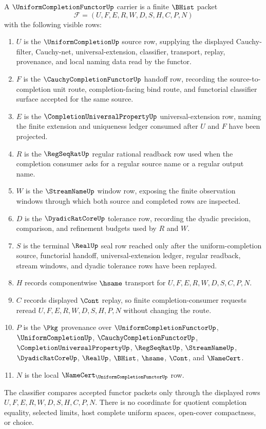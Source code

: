 \begin{definition}
\label{def:uniform-completion-functor-carrier}
A $\UniformCompletionFunctorUp$ carrier is a finite $\BHist$ packet
$$
\mathcal{F}=(U,F,E,R,W,D,S,H,C,P,N)
$$
with the following visible rows:
\begin{enumerate}
\item $U$ is the $\UniformCompletionUp$ source row, supplying the displayed Cauchy-filter, Cauchy-net, universal-extension, classifier, transport, replay, provenance, and local naming data read by the functor.
\item $F$ is the $\CauchyCompletionFunctorUp$ handoff row, recording the source-to-completion unit route, completion-facing bind route, and functorial classifier surface accepted for the same source.
\item $E$ is the $\CompletionUniversalPropertyUp$ universal-extension row, naming the finite extension and uniqueness ledger consumed after $U$ and $F$ have been projected.
\item $R$ is the $\RegSeqRatUp$ regular rational readback row used when the completion consumer asks for a regular source name or a regular output name.
\item $W$ is the $\StreamNameUp$ window row, exposing the finite observation windows through which both source and completed rows are inspected.
\item $D$ is the $\DyadicRatCoreUp$ tolerance row, recording the dyadic precision, comparison, and refinement budgets used by $R$ and $W$.
\item $S$ is the terminal $\RealUp$ seal row reached only after the uniform-completion source, functorial handoff, universal-extension ledger, regular readback, stream windows, and dyadic tolerance rows have been replayed.
\item $H$ records componentwise $\hsame$ transport for $U,F,E,R,W,D,S,C,P,N$.
\item $C$ records displayed $\Cont$ replay, so finite completion-consumer requests reread $U,F,E,R,W,D,S,H,P,N$ without changing the route.
\item $P$ is the $\Pkg$ provenance over $\UniformCompletionFunctorUp$, $\UniformCompletionUp$, $\CauchyCompletionFunctorUp$, $\CompletionUniversalPropertyUp$, $\RegSeqRatUp$, $\StreamNameUp$, $\DyadicRatCoreUp$, $\RealUp$, $\BHist$, $\hsame$, $\Cont$, and $\NameCert$.
\item $N$ is the local $\NameCert_{\UniformCompletionFunctorUp}$ row.
\end{enumerate}
The classifier compares accepted functor packets only through the displayed rows $U,F,E,R,W,D,S,H,C,P,N$. There is no coordinate for quotient completion equality, selected limits, host complete uniform spaces, open-cover compactness, or choice.
\end{definition}

